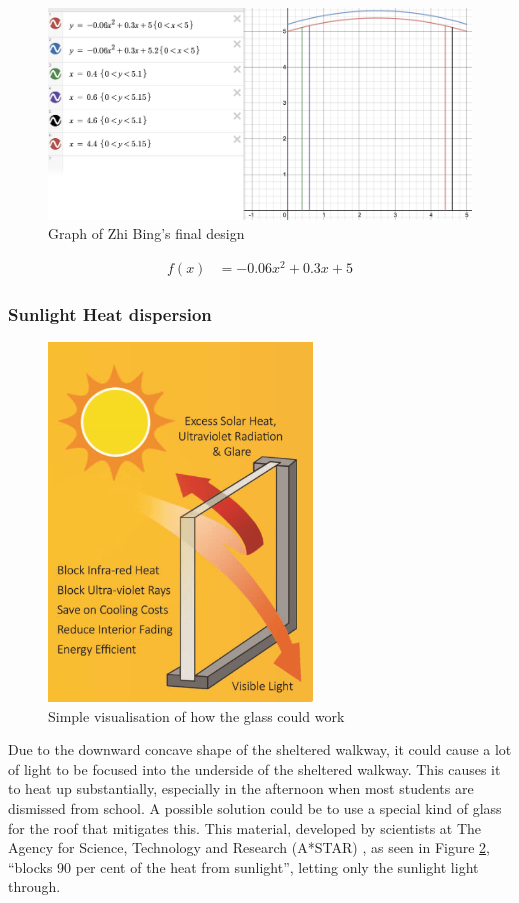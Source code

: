 \documentclass[a4paper,titlepage]{article}
\begin{document}
\begin{figure}[htbp]
    \centering
    \includegraphics[width=\textwidth]{zhiBingDesign.png}
    \caption{Graph of Zhi Bing's final design}
    \label{fig:zhiBingDesign}
\end{figure}

\begin{align}
    f(x)&=-0.06x^2+0.3x+5
\end{align}

\subsubsection{Sunlight Heat dispersion}

\begin{figure}[htbp]
    \centering
    \includegraphics[width=7cm]{heatGlass.png}
    \caption{Simple visualisation of how the glass could work}
    \label{fig:heatGlass}
\end{figure}

Due to the downward concave shape of the sheltered walkway, it could cause a lot of light to be focused into the underside of the sheltered walkway. This causes it to heat up substantially, especially in the afternoon when most students are dismissed from school. A possible solution could be to use a special kind of glass for the roof that mitigates this. This material, developed by scientists at The Agency for Science, Technology and Research (A*STAR) \cite{sciencedaily-heat}, as seen in Figure \ref{fig:heatGlass}, ``blocks 90 per cent of the heat from sunlight'', letting only the sunlight light through. 
\end{document}

